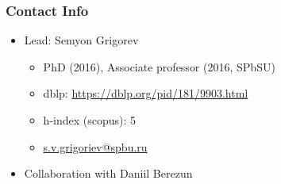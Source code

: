 \documentclass[xcolor=table,aspectratio=169]{beamer}
\begin{document}
\begin{frame}[fragile]
  \frametitle{Contact Info}  
  \begin{itemize}      
      \item Lead: Semyon Grigorev      
      \begin{itemize}
        \item PhD (2016), Associate professor (2016, SPbSU)
        \item dblp: \href{https://dblp.org/pid/181/9903.html}{https://dblp.org/pid/181/9903.html}
        \item h-index (scopus): 5
        \item \href{s.v.grigoriev@spbu.ru}{s.v.grigoriev@spbu.ru}
      \end{itemize}
      \item Collaboration with Daniil Berezun      
    \end{itemize}
\end{frame}
\end{document}
